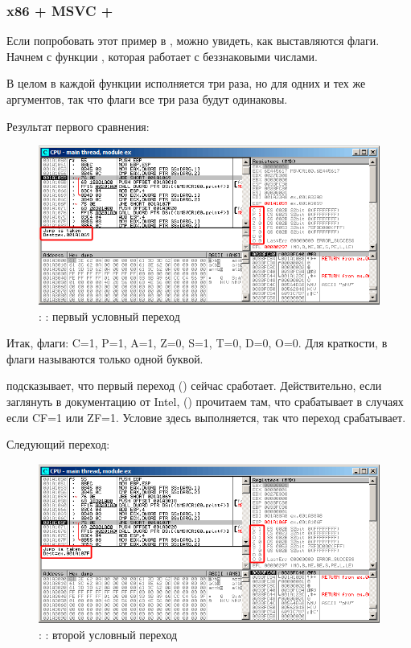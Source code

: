 \clearpage
\subsubsection{x86 + MSVC + \olly}
\myindex{\olly}

Если попробовать этот пример в \olly, можно увидеть, как выставляются флаги.
Начнем с функции , которая работает с беззнаковыми числами.

В целом в каждой функции \CMP исполняется три раза, но для одних и тех же аргументов, 
так что флаги все три раза будут одинаковы.

Результат первого сравнения:

\begin{figure}[H]
\centering
\includegraphics[scale=\FigScale]{patterns/07_jcc/simple/olly_unsigned1.png}
\caption{\olly: : первый условный переход}
\label{fig:jcc_olly_unsigned_1}
\end{figure}

Итак, флаги: C=1, P=1, A=1, Z=0, S=1, T=0, D=0, O=0.
Для краткости, в \olly флаги называются только одной буквой.

\olly подсказывает, что первый переход (\JBE) сейчас сработает.
Действительно, если заглянуть в документацию от Intel, 
() прочитаем там, что \JBE срабатывает в случаях если CF=1 или ZF=1.
Условие здесь выполняется, так что переход срабатывает.

\clearpage
Следующий переход:

\begin{figure}[H]
\centering
\includegraphics[scale=\FigScale]{patterns/07_jcc/simple/olly_unsigned2.png}
\caption{\olly: : второй условный переход}
\label{fig:jcc_olly_unsigned_2}
\end{figure}

